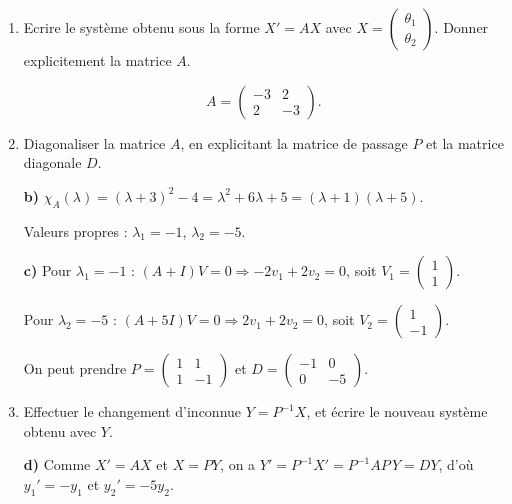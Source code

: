 \begin{enumerate}[itemsep=2em]
\begin{enumerate}[label=\alph*), itemsep=0.6em]
  \item Ecrire le système obtenu sous la forme $X' = AX$ avec $X = \begin{pmatrix} \theta_1 \\ \theta_2 \end{pmatrix}$. Donner explicitement la matrice $A$.

\begin{solution}
\[
  A = \begin{pmatrix} -3 & 2 \\ 2 & -3 \end{pmatrix}.
\]
\end{solution}

  \item Diagonaliser la matrice $A$, en explicitant la matrice de passage $P$ et la matrice diagonale $D$.

\begin{solution}
\textbf{b)} $\chi_A(\lambda) = (\lambda+3)^2 - 4 = \lambda^2 + 6\lambda + 5 = (\lambda+1)(\lambda+5)$.

Valeurs propres : $\lambda_1 = -1$, $\lambda_2 = -5$.

\textbf{c)} Pour $\lambda_1 = -1$ : $(A + I)V = 0 \Rightarrow -2v_1 + 2v_2 = 0$, soit $V_1 = \begin{pmatrix} 1 \\ 1 \end{pmatrix}$.

Pour $\lambda_2 = -5$ : $(A + 5I)V = 0 \Rightarrow 2v_1 + 2v_2 = 0$, soit $V_2 = \begin{pmatrix} 1 \\ -1 \end{pmatrix}$.

On peut prendre $P = \begin{pmatrix} 1 & 1 \\ 1 & -1 \end{pmatrix}$ et $D = \begin{pmatrix} -1 & 0 \\ 0 & -5 \end{pmatrix}$.
\end{solution}

  \item Effectuer le changement d'inconnue $Y = P^{-1}X$, et écrire le nouveau système obtenu avec $Y$.

\begin{solution}
\textbf{d)} Comme $X' = AX$ et $X = PY$, on a $Y' = P^{-1}X' = P^{-1}AP\,Y = DY$, d'où $y_1' = -y_1$ et $y_2' = -5y_2$.
\end{solution}


\end{enumerate}
\end{enumerate}
